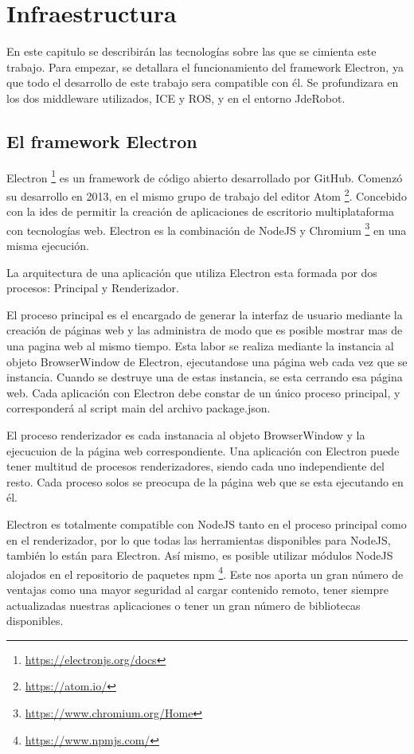 \chapter{Infraestructura}\label{cap.infraestructura}
En este capitulo se describirán las tecnologías sobre las que se cimienta este trabajo. Para empezar, se detallara el funcionamiento del framework Electron, ya que todo el desarrollo de este trabajo sera compatible con él. Se profundizara en los dos middleware utilizados, ICE y ROS, y en el entorno JdeRobot.

\section{El framework Electron}
Electron \footnote{\url{https://electronjs.org/docs}}  es un framework de código abierto desarrollado por GitHub. Comenzó su desarrollo en 2013, en el mismo grupo de trabajo del editor Atom \footnote{\url{https://atom.io/}}. Concebido con la ides de permitir la creación de aplicaciones de escritorio multiplataforma con tecnologías web. Electron es la combinación de NodeJS y Chromium \footnote{\url{https://www.chromium.org/Home}} en una misma ejecución.

La arquitectura de una aplicación que utiliza Electron esta formada por dos procesos: Principal y Renderizador. 

El proceso principal es el encargado de generar la interfaz de usuario mediante la creación de páginas web y las administra de modo que es posible mostrar mas de una pagina web al mismo tiempo. Esta labor se realiza mediante la instancia al objeto BrowserWindow de Electron, ejecutandose una página web cada vez que se instancia. Cuando se destruye una de estas instancia, se esta cerrando esa página web. Cada aplicación con Electron debe constar de un único proceso principal, y corresponderá al script main del archivo package.json.

El proceso renderizador es cada instanacia al objeto BrowserWindow y la ejecucuion de la página web correspondiente. Una aplicación con Electron puede tener multitud de procesos renderizadores, siendo cada uno independiente del resto. Cada proceso solos se preocupa de la página web que se esta ejecutando en él.

Electron es totalmente compatible con NodeJS tanto en el proceso principal como en el renderizador, por lo que todas las herramientas disponibles para NodeJS, también lo están para Electron. Así mismo, es posible utilizar módulos NodeJS alojados en el repositorio de paquetes npm \footnote{\url{https://www.npmjs.com/}}. Este nos aporta un gran número de ventajas como una mayor seguridad al cargar contenido remoto, tener siempre actualizadas nuestras aplicaciones o tener un gran número de bibliotecas disponibles.


